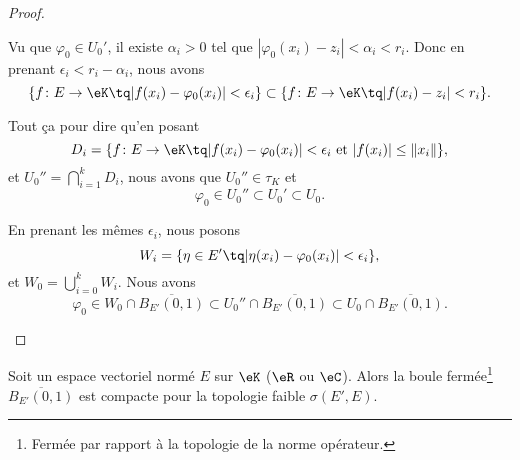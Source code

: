 \begin{proof}
\begin{subproof}
		Vu que \( \varphi_0\in U_0'\), il existe \( \alpha_i>0\) tel que \( | \varphi_0(x_i)-z_i |<\alpha_i<r_i\). Donc en prenant \( \epsilon_i<r_i-\alpha_i\), nous avons
		\begin{equation}
			\{f \colon E\to \eK\tq | f(x_i)-\varphi_0(x_i) |<\epsilon_i   \}\subset\{f \colon E\to \eK\tq | f(x_i)-z_i |<r_i   \}.
		\end{equation}

		Tout ça pour dire qu'en posant
		\begin{equation}
			D_i=\{f \colon E\to \eK\tq | f(x_i)-\varphi_0(x_i) |<\epsilon_i\text{ et }| f(x_i) |\leq \| x_i \|   \},
		\end{equation}
		et \( U_0''=\bigcap_{i=1}^kD_i\), nous avons que \( U_0''\in \tau_K\) et
		\begin{equation}
			\varphi_0\in U_0''\subset U_0'\subset U_0.
		\end{equation}

		En prenant les mêmes \( \epsilon_i\), nous posons
		\begin{equation}
			W_i=\{ \eta\in E'\tq | \eta(x_i)-\varphi_0(x_i) |<\epsilon_i \},
		\end{equation}
		et \( W_0=\bigcup_{i=0}^kW_i\). Nous avons
		\begin{equation}
			\varphi_0\in W_0\cap\overline{B_{E'}(0,1)}\subset U_0''\cap\overline{B_{E'}(0,1)}\subset U_0\cap\overline{B_{E'}(0,1)}.
		\end{equation}
	\end{subproof}
\end{proof}

\begin{theorem}	\label{THOooJNIQooOXGCKY}
	Soit un espace vectoriel normé \( E\) sur \( \eK\) (\( \eR\) ou \( \eC\)). Alors la boule fermée\footnote{Fermée par rapport à la topologie de la norme opérateur.} \( \overline{B_{E'}(0,1)}\) est compacte pour la topologie faible \( \sigma(E',E)\).
\end{theorem}

